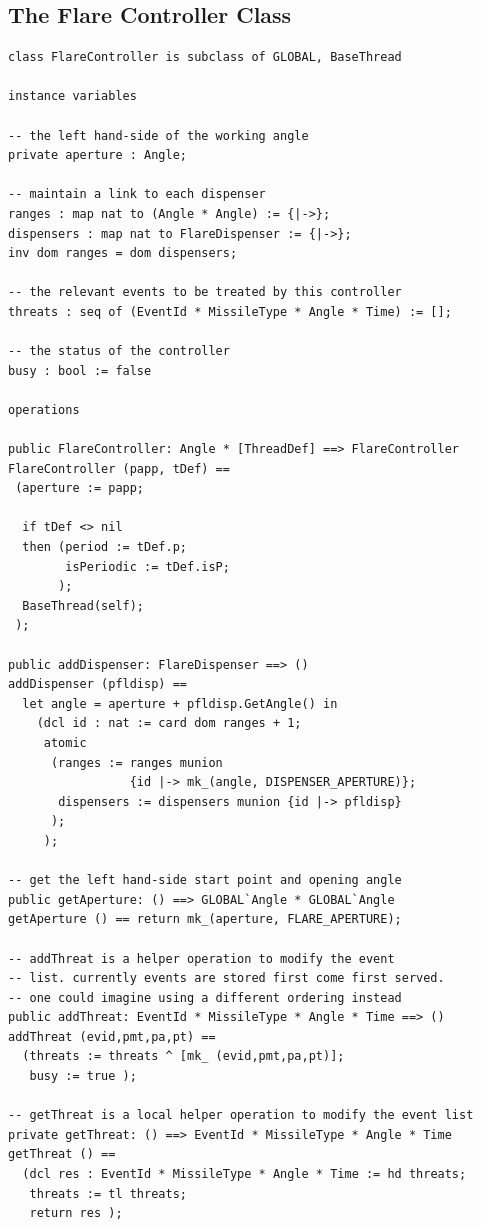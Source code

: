 \documentclass{overturerepchap}
\begin{document}
\subsection{The Flare Controller Class}

\begin{lstlisting}
class FlareController is subclass of GLOBAL, BaseThread

instance variables

-- the left hand-side of the working angle
private aperture : Angle;

-- maintain a link to each dispenser
ranges : map nat to (Angle * Angle) := {|->};
dispensers : map nat to FlareDispenser := {|->};
inv dom ranges = dom dispensers;

-- the relevant events to be treated by this controller
threats : seq of (EventId * MissileType * Angle * Time) := [];

-- the status of the controller
busy : bool := false

operations

public FlareController: Angle * [ThreadDef] ==> FlareController
FlareController (papp, tDef) == 
 (aperture := papp;
 
  if tDef <> nil
  then (period := tDef.p;
        isPeriodic := tDef.isP;
       );
  BaseThread(self);
 );

public addDispenser: FlareDispenser ==> ()
addDispenser (pfldisp) ==
  let angle = aperture + pfldisp.GetAngle() in
    (dcl id : nat := card dom ranges + 1;
     atomic
      (ranges := ranges munion 
                 {id |-> mk_(angle, DISPENSER_APERTURE)};
       dispensers := dispensers munion {id |-> pfldisp}
      );
     );

-- get the left hand-side start point and opening angle
public getAperture: () ==> GLOBAL`Angle * GLOBAL`Angle
getAperture () == return mk_(aperture, FLARE_APERTURE);

-- addThreat is a helper operation to modify the event
-- list. currently events are stored first come first served.
-- one could imagine using a different ordering instead
public addThreat: EventId * MissileType * Angle * Time ==> ()
addThreat (evid,pmt,pa,pt) ==
  (threats := threats ^ [mk_ (evid,pmt,pa,pt)];
   busy := true );

-- getThreat is a local helper operation to modify the event list
private getThreat: () ==> EventId * MissileType * Angle * Time
getThreat () ==
  (dcl res : EventId * MissileType * Angle * Time := hd threats;
   threats := tl threats;
   return res );


\end{lstlisting}
\end{document}
